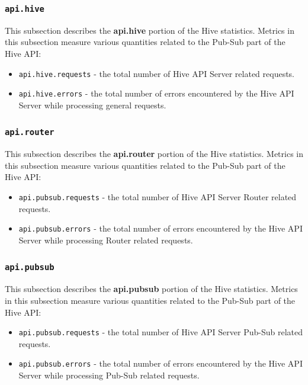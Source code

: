 \documentclass[a4paper]{article}
\begin{document}
\subsubsection{\texttt{api.hive}}
\label{sec-4-2-17}

This subsection describes the \textbf{api.hive} portion of the Hive statistics. Metrics in this subsection measure various quantities related to the Pub-Sub part of the Hive API:


\begin{itemize}
\item \texttt{api.hive.requests} - the total number of Hive API Server related requests.
\item \texttt{api.hive.errors} - the total number of errors encountered by the Hive API Server while processing general requests.
\end{itemize}
\subsubsection{\texttt{api.router}}
\label{sec-4-2-18}

This subsection describes the \textbf{api.router} portion of the Hive statistics. Metrics in this subsection measure various quantities related to the Pub-Sub part of the Hive API:


\begin{itemize}
\item \texttt{api.pubsub.requests} - the total number of Hive API Server Router related requests.
\item \texttt{api.pubsub.errors} - the total number of errors encountered by the Hive API Server while processing Router related requests.
\end{itemize}
\subsubsection{\texttt{api.pubsub}}
\label{sec-4-2-19}

This subsection describes the \textbf{api.pubsub} portion of the Hive statistics. Metrics in this subsection measure various quantities related to the Pub-Sub part of the Hive API:


\begin{itemize}
\item \texttt{api.pubsub.requests} - the total number of Hive API Server Pub-Sub related requests.
\item \texttt{api.pubsub.errors} - the total number of errors encountered by the Hive API Server while processing Pub-Sub related requests.
\end{itemize}
\end{document}
